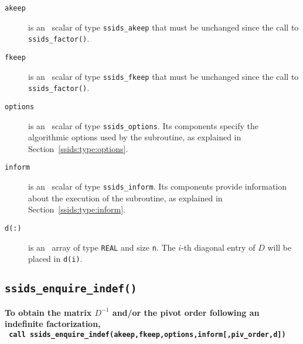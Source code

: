 \begin{description}

\item[\texttt{akeep}]  is an \intentin\ scalar of type {\tt ssids\_akeep} that
must be unchanged since the call to {\tt ssids\_factor()}.

\item[\texttt{fkeep}]  is an \intentin\ scalar of type {\tt ssids\_fkeep} that
must be unchanged since the call to {\tt ssids\_factor()}.

\item[\texttt{options}] is an \intentin\ scalar of type {\tt ssids\_options}.
Its components specify the algorithmic options used by the subroutine, as
explained in Section~\ref{ssids:type:options}.

\item[\texttt{inform}] is an \intentout\ scalar of type
{\tt ssids\_inform}. Its components provide information about the execution
of the subroutine, as explained in Section~\ref{ssids:type:inform}.

\item[\texttt{d(:)}] is an  \intentout\ array of type {\tt  REAL} and
size {\tt n}. The $i$-th diagonal entry of $D$ will be placed in {\tt d(i)}.

\end{description}

\subsection{\texttt{ssids\_enquire\_indef()}}
\textbf{To obtain the matrix $D^{-1}$ and/or the pivot order following an
   indefinite factorization,
   \vspace*{0.1cm} \\
   \texttt{ \hspace*{0.2cm}
     call ssids\_enquire\_indef(akeep,fkeep,options,inform[,piv\_order,d])
   }
}

